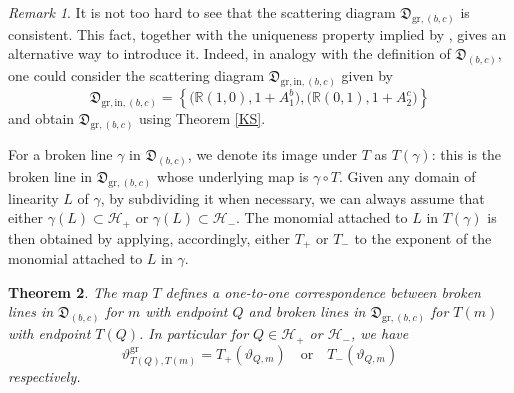 \documentclass[11pt]{amsart}
\newtheorem{theorem}{Theorem}[section]
\theoremstyle{remark}
\newtheorem{remark}[theorem]{Remark}
\numberwithin{equation}{section}
\newcommand{\RR}{\mathbb{R}}
\newcommand{\fD}{\mathfrak{D}}
\newcommand{\gr}{\mathrm{gr}}
\begin{document}
\begin{remark}
  It is not too hard to see that the scattering diagram $\fD_{\gr,(b,c)}$ is
  consistent. This fact, together with the uniqueness property implied by
  \cite[Theorem 1.7]{GHKK}, gives an alternative way to introduce it. Indeed, in
  analogy with the definition of $\fD_{(b,c)}$, one could consider the
  scattering diagram
  $\fD_{\gr,\mathrm{in},(b,c)}$ given by 
  \[
    \fD_{\gr,\mathrm{in},(b,c)}=
    \left\{
      \big(\RR (1,0), 1+A_1^b\big), 
      \big(\RR (0,1), 1+A_2^c\big)
    \right\}
  \]
  and obtain $\fD_{\gr,(b,c)}$ using Theorem \ref{KS}. 
\end{remark}

For a broken line $\gamma$ in $\fD_{(b,c)}$, we denote its image under $T$ as
$T(\gamma)$: this is the broken line in $\fD_{\gr,(b,c)}$ whose underlying map
is $\gamma\circ T$. Given any domain of linearity $L$ of $\gamma$, by
subdividing it when necessary, we can always assume that either $\gamma(L)
\subset \mathcal{H}_{+} $ or $\gamma(L)\subset \mathcal{H}_{-}$. The monomial
attached to $L$ in $T(\gamma)$ is then obtained by applying, accordingly, either
$T_+$ or $T_-$ to the exponent of the monomial attached to $L$ in $\gamma$.

\begin{theorem}
  \label{thm:T_on_broken_lines}
  The map $T$ defines a one-to-one correspondence between broken lines in $\fD_{(b,c)}$
  for $m$ with endpoint $Q$ and broken lines in $\fD_{\gr,(b,c)}$ for $T(m)$
  with endpoint $T(Q)$. In particular for $Q \in \mathcal{H}_+$ or $\mathcal{H}_-$,
  we have
  \[ 
    \vartheta^{\gr}_{T(Q),T( m)} = 
    T_{+} \left(\vartheta_{Q, m}\right) 
    \quad
    \mbox{or} 
    \quad
    T_{-} \left(\vartheta_{Q, m}\right)
  \]
  respectively.
\end{theorem}
\end{document}
